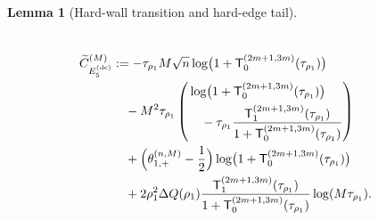 \documentclass[a4paper]{article}
\newtheorem{lemma}[theorem]{Lemma}
\numberwithin{equation}{section}
\begin{document}
\begin{lemma}[Hard-wall transition and hard-edge tail]
\begin{description}
\begin{align*}
\\
\widetilde{C}_{ E_5^{(\mathrm{dc})}}^{(M)}
&:=
-\tau_{\rho_1}M\sqrt{n}\log\bigl(1+\mathsf{T}_{0}^{(2m+1,3m)}(\tau_{\rho_1})\bigr)
\\
&\quad
-M^2\tau_{\rho_1}\left(\begin{aligned}& 
\log\bigl(1+\mathsf{T}_{0}^{(2m+1,3m)}(\tau_{\rho_1})\bigr)
\\
&\quad-\tau_{\rho_1}
\frac{\mathsf{T}_{1}^{(2m+1,3m)}(\tau_{\rho_1})}{1+\mathsf{T}_{0}^{(2m+1,3m)}(\tau_{\rho_1})}
\end{aligned}\right)
\\
&\quad
+
\Bigl(\theta_{1,+}^{(n,M)}-\frac{1}{2}\Bigr)
\log\bigl(1+\mathsf{T}_{0}^{(2m+1,3m)}(\tau_{\rho_1})\bigr)
\\
&\quad
+
2\rho_1^2\Delta Q(\rho_1)
\frac{\mathsf{T}_{1}^{(2m+1,3m)}(\tau_{\rho_1})}{1+\mathsf{T}_{0}^{(2m+1,3m)}(\tau_{\rho_1})}\log(M\tau_{\rho_1}).
\end{align*}
    
\end{description}
\end{lemma}
\end{document}

